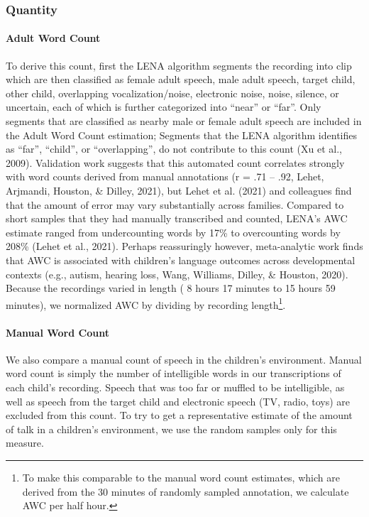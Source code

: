 \documentclass[
  man]{apa6}
\let\oldparagraph\paragraph
\renewcommand{\paragraph}[1]{\oldparagraph{#1}\mbox{}}
\begin{document}
\hypertarget{quantity}{%
\subsubsection{Quantity}\label{quantity}}

\hypertarget{adult-word-count}{%
\paragraph{Adult Word Count}\label{adult-word-count}}

To derive this count, first the LENA algorithm segments the recording into clip which are then classified as female adult speech, male adult speech, target child, other child, overlapping vocalization/noise, electronic noise, noise, silence, or uncertain, each of which is further categorized into ``near'' or ``far''. Only segments that are classified as nearby male or female adult speech are included in the Adult Word Count estimation; Segments that the LENA algorithm identifies as ``far'', ``child'', or ``overlapping'', do not contribute to this count (Xu et al., 2009). Validation work suggests that this automated count correlates strongly with word counts derived from manual annotations (r = .71 -- .92, Lehet, Arjmandi, Houston, \& Dilley, 2021), but Lehet et al. (2021) and colleagues find that the amount of error may vary substantially across families. Compared to short samples that they had manually transcribed and counted, LENA's AWC estimate ranged from undercounting words by 17\% to overcounting words by 208\% (Lehet et al., 2021). Perhaps reassuringly however, meta-analytic work finds that AWC is associated with children's language outcomes across developmental contexts (e.g., autism, hearing loss, Wang, Williams, Dilley, \& Houston, 2020). Because the recordings varied in length ( 8 hours 17 minutes to 15 hours 59 minutes), we normalized AWC by dividing by recording length\footnote{To make this comparable to the manual word count estimates, which are derived from the 30 minutes of randomly sampled annotation, we calculate AWC per half hour.}.

\hypertarget{manual-word-count}{%
\paragraph{Manual Word Count}\label{manual-word-count}}

We also compare a manual count of speech in the children's environment. Manual word count is simply the number of intelligible words in our transcriptions of each child's recording. Speech that was too far or muffled to be intelligible, as well as speech from the target child and electronic speech (TV, radio, toys) are excluded from this count. To try to get a representative estimate of the amount of talk in a children's environment, we use the random samples only for this measure.
\end{document}
